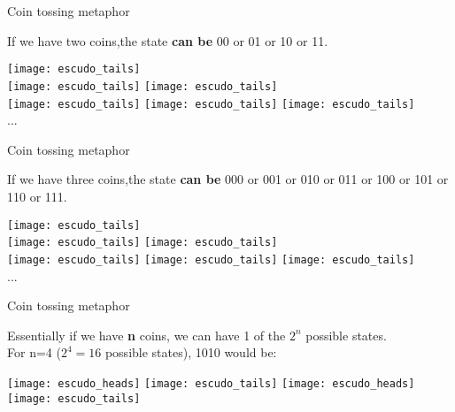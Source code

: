 \documentclass[aspectratio=43]{beamer}
\begin{document}
\begin{frame}{Coin tossing metaphor}
	\begin{cardTiny}
		If we have two coins,the state \textbf{can be} 00 or 01 or 10 or 11. 
	\end{cardTiny}
    \begin{center}
        \texttt{[image: escudo\_tails]}\\
        \texttt{[image: escudo\_tails]}
        \texttt{[image: escudo\_tails]}\\
        \texttt{[image: escudo\_tails]}
        \texttt{[image: escudo\_tails]}
        \texttt{[image: escudo\_tails]}\\...
	\end{center}
\pagenumber
\end{frame}

\begin{frame}{Coin tossing metaphor}
	\begin{cardTiny}
		If we have three coins,the state \textbf{can be} 000 or 001 or 010 or 011 or 100 or 101 or 110 or 111. 
	\end{cardTiny}
    \begin{center}
        \texttt{[image: escudo\_tails]}\\
        \texttt{[image: escudo\_tails]}
        \texttt{[image: escudo\_tails]}\\
        \texttt{[image: escudo\_tails]}
        \texttt{[image: escudo\_tails]}
        \texttt{[image: escudo\_tails]}\\...
	\end{center}
\pagenumber
\end{frame}

\begin{frame}{Coin tossing metaphor}
	\begin{card}
		Essentially if we have \textbf{n} coins, we can have 1 of the \textbf{$2^n$} possible states.\\
		For n=4 ($2^4=16$ possible states), 1010 would be:
	\end{card}
    \begin{center}
        \texttt{[image: escudo\_heads]}
        \texttt{[image: escudo\_tails]}
        \texttt{[image: escudo\_heads]}
        \texttt{[image: escudo\_tails]}
	\end{center}
\pagenumber
\end{frame}
\end{document}
